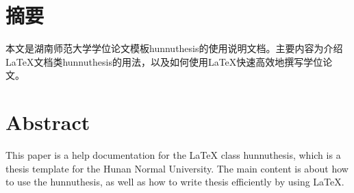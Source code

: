 \maketitle%
\MAKETITLE%
\makedeclaration%
\intobmk\chapter*{摘\quad 要}%
\setcounter{page}{1}%

本文是湖南师范大学学位论文模板hunnuthesis的使用说明文档。主要内容为介绍\LaTeX{}文档类hunnuthesis的用法，以及如何使用\LaTeX{}快速高效地撰写学位论文。

\intobmk\chapter*{Abstract}%

This paper is a help documentation for the \LaTeX{} class hunnuthesis, which is  a thesis template for the Hunan Normal University. The main content is about how to use the hunnuthesis, as well as how to write thesis efficiently by using \LaTeX{}.

 	